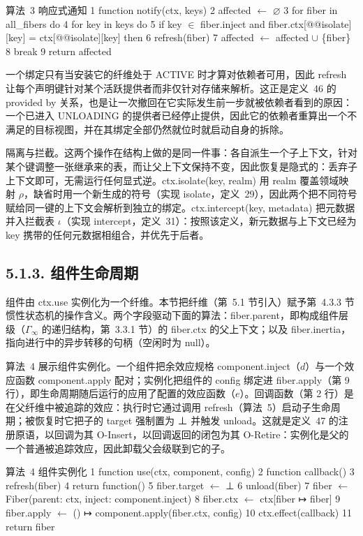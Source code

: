 算法~3 响应式通知
1 function notify(ctx, keys)
2 affected $\leftarrow$ ⌀
3 for fiber in all\_fibers do
4 for key in keys do
5 if key $\in$ fiber.inject and fiber.ctx{[}@@isolate{]}{[}key{]} = ctx{[}@@isolate{]}{[}key{]} then
6 refresh(fiber)
7 affected $\leftarrow$ affected $\cup$ \{fiber\}
8 break
9 return affected

一个绑定只有当安装它的纤维处于 ACTIVE 时才算对依赖者可用，因此 refresh 让每个声明键针对某个活跃提供者而非仅针对存储来解析。这正是定义~46 的 provided by 关系，也是让一次撤回在它实际发生前一步就被依赖者看到的原因：一个已进入 UNLOADING 的提供者已经停止提供，因此它的依赖者重算出一个不满足的目标视图，并在其绑定全部仍然就位时就启动自身的拆除。

隔离与拦截。这两个操作在结构上做的是同一件事：各自派生一个子上下文，针对某个键调整一张继承来的表，而让父上下文保持不变，因此恢复是隐式的：丢弃子上下文即可，无需运行任何显式逆。ctx.isolate(key, realm) 用 realm 覆盖领域映射 \(\rho\)，缺省时用一个新生成的符号（实现 isolate，定义~29），因此两个把不同符号赋给同一键的上下文会解析到独立的绑定。ctx.intercept(key, metadata) 把元数据并入拦截表 \(\iota\)（实现 intercept，定义~31）：按照该定义，新元数据与上下文已经为 key 携带的任何元数据相组合，并优先于后者。

\subsection{5.1.3. 组件生命周期}\label{component-lifecycle}

组件由 ctx.use 实例化为一个纤维。本节把纤维（第~5.1 节引入）赋予第~4.3.3 节惯性状态机的操作含义。两个字段驱动下面的算法：fiber.parent，即构成组件层级（\(\Gamma _ { \infty }\) 的递归结构，第~3.3.1 节）的 fiber.ctx 的父上下文；以及 fiber.inertia，指向进行中的异步转移的句柄（空闲时为 null）。

算法~4 展示组件实例化。一个组件把余效应规格 component.inject（\(d\)）与一个效应函数 component.apply 配对；实例化把组件的 config 绑定进 fiber.apply（第 9 行），即生命周期随后运行的应用了配置的效应函数（\(e\)）。回调函数（第 2 行）是在父纤维中被追踪的效应：执行时它通过调用 refresh（算法~5）启动子生命周期；被恢复时它把子的 target 强制置为 ⊥ 并触发 unload。这就是定义~47 的注册原语，以回调为其 O-Insert，以回调返回的闭包为其 O-Retire：实例化是父的一个普通被追踪效应，因此卸载父会级联到它的子。

算法~4 组件实例化
1 function use(ctx, component, config)
2 function callback()
3 refresh(fiber)
4 return function()
5 fiber.target $\leftarrow$ ⊥
6 unload(fiber)
7 fiber $\leftarrow$ Fiber(parent: ctx, inject: component.inject)
8 fiber.ctx $\leftarrow$ ctx{[}fiber ↦ fiber{]}
9 fiber.apply $\leftarrow$ () ↦ component.apply(fiber.ctx, config)
10 ctx.effect(callback)
11 return fiber

